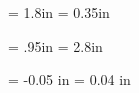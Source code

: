 

%
%
%
%
%
%




\pagestyle{empty}


\newcount\nrows\newcount\ncols
{}		%

\newdimen\vcorner \newdimen\hcorner 
\newdimen\vlabel \newdimen\hlabel

\vcorner = 1.8in	%
\hcorner = 0.35in	%

\vlabel  = .95in	%
\hlabel  = 2.8in	%

\newdimen \vfudge \newdimen \hfudge
\vfudge = -0.05 in 	%
\vfudge = 0.04 in

